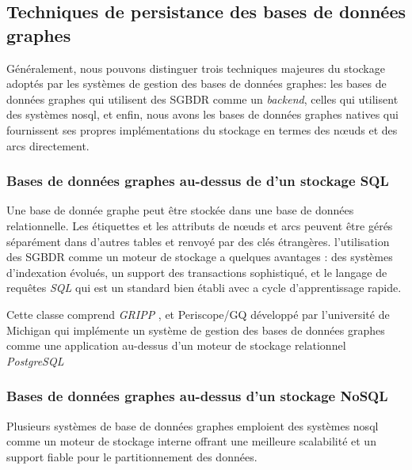 \begin{itemize}
\newpage
  \subsection{Techniques de persistance des bases de données graphes}
  \label{sec:persistence-tech}
  Généralement, nous pouvons distinguer trois techniques majeures du
  stockage adoptés par les systèmes de gestion des bases de données
  graphes: les bases de données graphes qui utilisent des
  \acrshort{SGBDR} comme un \emph{backend}, celles qui utilisent des
  systèmes \acrshort{nosql}, et enfin, nous avons les bases de données
  graphes natives qui fournissent ses propres implémentations du
  stockage en termes des nœuds et des arcs directement.

    \subsubsection{Bases de données graphes au-dessus de d'un stockage  SQL}
    \label{sec:graphdb-over-sql}
    Une base de donnée graphe peut être stockée dans une base de
    données relationnelle. Les étiquettes et les attributs de nœuds et
    arcs peuvent être gérés séparément dans d'autres tables et renvoyé
    par des clés étrangères. l'utilisation des \acrshort{SGBDR} comme
    un moteur de stockage a quelques avantages : des systèmes
    d'indexation évolués, un support des transactions sophistiqué, et
    le langage de requêtes \emph{SQL} qui est un standard bien établi
    avec a cycle d'apprentissage rapide.


    Cette classe comprend \emph{GRIPP} \cite{trissl2007fast}, et
    Periscope/GQ \cite{tian2008periscope} développé par l'université
    de Michigan qui implémente un système de gestion des bases de
    données graphes comme une application au-dessus d'un moteur de
    stockage relationnel \emph{PostgreSQL}

    \subsubsection{Bases de données graphes au-dessus d'un stockage NoSQL}
    \label{sec:graphdb-over-nosql}
    Plusieurs systèmes de base de données graphes emploient des
    systèmes \acrshort{nosql} comme un moteur de stockage interne
    offrant une meilleure scalabilité et un support fiable pour le
    partitionnement des données.


\end{itemize}
